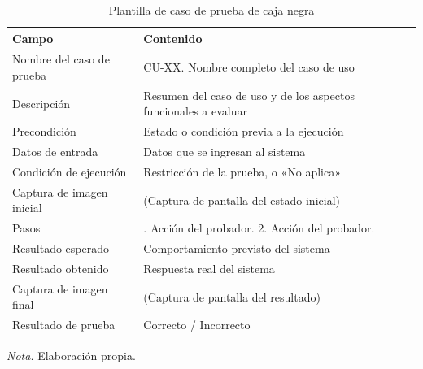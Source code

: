 \begin{table}[H]
\caption{Plantilla de caso de prueba de caja negra}
\label{tab:pru_plantilla}
\centering
\footnotesize\linespread{1}\selectfont
\renewcommand{\arraystretch}{1.3}
\begin{tabular}{>{\raggedright\arraybackslash}p{4.5cm}>{\raggedright\arraybackslash}p{10.5cm}}
\toprule
\textbf{Campo} & \textbf{Contenido} \\
\midrule
Nombre del caso de prueba & CU-XX. Nombre completo del caso de uso \\
Descripción & Resumen del caso de uso y de los aspectos funcionales a evaluar \\
Precondición & Estado o condición previa a la ejecución \\
Datos de entrada & Datos que se ingresan al sistema \\
Condición de ejecución & Restricción de la prueba, o «No aplica» \\
Captura de imagen inicial & (Captura de pantalla del estado inicial) \\
Pasos & 1. Acción del probador. 2. Acción del probador. \\
Resultado esperado & Comportamiento previsto del sistema \\
Resultado obtenido & Respuesta real del sistema \\
Captura de imagen final & (Captura de pantalla del resultado) \\
Resultado de prueba & Correcto / Incorrecto \\
\bottomrule
\end{tabular}

\smallskip
\noindent\raggedright\textit{Nota.} Elaboración propia.
\end{table}
